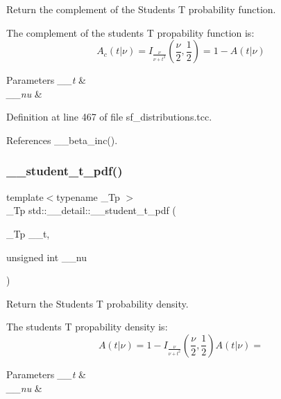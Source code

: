 Return the complement of the Students T probability function. 

The complement of the students T propability function is\+: \[ A_c(t|\nu) = I_{\frac{\nu}{\nu + t^2}}(\frac{\nu}{2}, \frac{1}{2}) = 1 - A(t|\nu) \]


\begin{DoxyParams}{Parameters}
{\em \+\_\+\+\_\+t} & \\
\hline
{\em \+\_\+\+\_\+nu} & \\
\hline
\end{DoxyParams}


Definition at line 467 of file sf\+\_\+distributions.\+tcc.



References \+\_\+\+\_\+beta\+\_\+inc().

\mbox{\label{namespacestd_1_1____detail_a866bf8f03fd2d5de5024837727beecd8}} 
\subsubsection{\texorpdfstring{\+\_\+\+\_\+student\+\_\+t\+\_\+pdf()}{\_\_student\_t\_pdf()}}
{\footnotesize\ttfamily template$<$typename \+\_\+\+Tp $>$ \\
\+\_\+\+Tp std\+::\+\_\+\+\_\+detail\+::\+\_\+\+\_\+student\+\_\+t\+\_\+pdf (\begin{DoxyParamCaption}\item[{\+\_\+\+Tp}]{\+\_\+\+\_\+t,  }\item[{unsigned int}]{\+\_\+\+\_\+nu }\end{DoxyParamCaption})}



Return the Students T probability density. 

The students T propability density is\+: \[ A(t|\nu) = 1 - I_{\frac{\nu}{\nu + t^2}}(\frac{\nu}{2}, \frac{1}{2}) A(t|\nu) = \]


\begin{DoxyParams}{Parameters}
{\em \+\_\+\+\_\+t} & \\
\hline
{\em \+\_\+\+\_\+nu} & \\
\hline
\end{DoxyParams}


